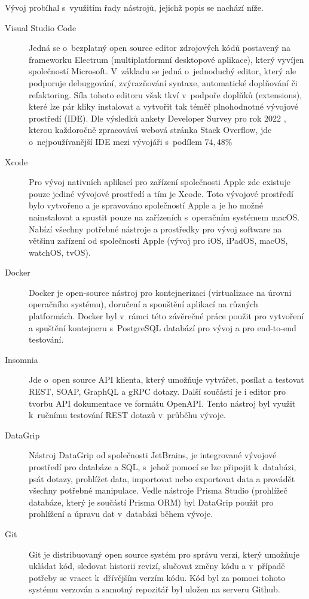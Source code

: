 \documentclass[thesis=M,czech]{FITthesis}[2019/12/23]
\begin{document}
Vývoj probíhal s~využitím řady nástrojů, jejichž popis se nachází níže.

\begin{description}
    \item[Visual Studio Code] Jedná se o~bezplatný open source editor zdrojových kódů postavený na frameworku Electrum (multiplatformní desktopové aplikace), který vyvíjen společností Microsoft. V~základu se jedná o~jednoduchý editor, který ale podporuje debuggování, zvýrazňování syntaxe, automatické doplňování či refaktoring. Síla tohoto editoru však tkví v~podpoře doplňků (extensions), které lze pár kliky instalovat a vytvořit tak téměř plnohodnotné vývojové prostředí (IDE). Dle výsledků ankety Developer Survey pro rok 2022  \cite{stackoverflow-survey}, kterou každoročně zpracovává webová stránka Stack Overflow, jde o~nejpoužívanější IDE mezi vývojáři s~podílem $74,48 \%$ \cite{vscode-1, vscode-2}
    \item[Xcode] Pro vývoj nativních aplikací pro zařízení společnosti Apple zde existuje pouze jediné vývojové prostředí a tím je Xcode. Toto vývojové prostředí bylo vytvořeno a je spravováno společností Apple a je ho možné nainstalovat a spustit pouze na zařízeních s~operačním systémem macOS. Nabízí všechny potřebné nástroje a prostředky pro vývoj software na většinu zařízení od společnosti Apple (vývoj pro iOS, iPadOS, macOS, watchOS, tvOS). \cite{xcode}
    \item[Docker] Docker je open-source nástroj pro kontejnerizaci (virtualizace na úrovni operačního systému), doručení a spouštění aplikací na různých platformách. Docker byl v~rámci této závěrečné práce použit pro vytvoření a spuštění kontejneru s~PostgreSQL databází pro vývoj a pro end-to-end testování. \cite{docker-1, docker-2}
    \item[Insomnia] Jde o~open source API klienta, který umožňuje vytvářet, posílat a testovat REST, SOAP, GraphQL a gRPC dotazy. Další součástí je i editor pro tvorbu API dokumentace ve formátu OpenAPI. Tento nástroj byl využit k~ručnímu testování REST dotazů v~průběhu vývoje. \cite{insomnia}
    \item[DataGrip] Nástroj DataGrip od společnosti JetBrains, je integrované vývojové prostředí pro databáze a SQL, s~jehož pomocí se lze připojit k~databázi, psát dotazy, prohlížet data, importovat nebo exportovat data a provádět všechny potřebné manipulace. Vedle nástroje Prisma Studio (prohlížeč databáze, který je součástí Prisma ORM) byl DataGrip použit pro prohlížení a úpravu dat v~databázi během vývoje. \cite{datagrip}
    \item[Git] Git je distribuovaný open source systém pro správu verzí, který umožňuje ukládat kód, sledovat historii revizí, slučovat změny kódu a v~případě potřeby se vracet k~dřívějším verzím kódu. Kód byl za pomoci tohoto systému verzován a samotný repozitář byl uložen na serveru Github. \cite{git}
\end{description}
\end{document}
